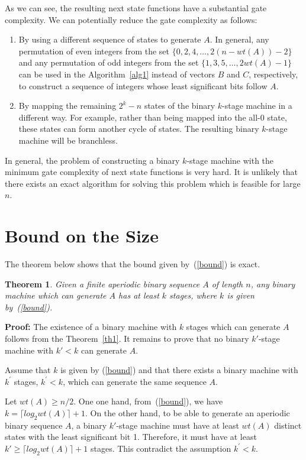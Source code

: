\documentclass[twocolumn]{IEEEtran} \usepackage{epsfig}
\newtheorem{theorem}{Theorem}
\begin{document}
As we can see, the resulting next state functions have a substantial gate complexity. We can potentially reduce the gate complexity as follows:
\begin{enumerate}
\item By using a different sequence of states to generate $A$. In general, any permutation of even integers from the set $\{0,2,4,\ldots,2(n-wt(A))-2\}$ and any permutation of odd integers from the set $\{1,3,5,\ldots,2wt(A)-1\}$ can be used in the Algorithm~\ref{alg1} instead of vectors $B$ and $C$, respectively, to construct a sequence of integers whose least significant bits follow $A$.
\item By mapping the remaining $2^k-n$ states of the binary $k$-stage machine in a different way.
For example, rather than being mapped into the all-0 state, these states can form another cycle of states.
The resulting binary $k$-stage machine will be branchless.
\end{enumerate}

In general, the problem of constructing a binary $k$-stage machine with the minimum gate complexity 
of next state functions is very hard. It is unlikely that there exists an exact algorithm for solving this problem 
which is feasible for large $n$.

\section{Bound on the Size}

The theorem below shows that the bound given by~(\ref{bound}) is exact.

\begin{theorem} \label{th2}
Given a finite aperiodic binary sequence $A$ of length $n$, any 
binary machine which can generate $A$  has at least $k$ stages, where
$k$ is given by~(\ref{bound}).
\end{theorem}
{\bf Proof:} 
The existence of a binary machine with $k$ stages which can generate $A$
follows from the Theorem~\ref{th1}.  
It remains to prove that no binary $k'$-stage machine with $k' < k$ can generate $A$.

Assume that $k$ is given by (\ref{bound}) and that there exists a binary machine with  
$k^{'}$ stages, $k^{'} < k$, which can generate the same sequence $A$. 

Let $wt(A) \geq n/2$. One one hand, from~(\ref{bound}), we have $k = \lceil log_2 wt(A) \rceil + 1$.
On the other hand, to be able to generate an aperiodic binary sequence $A$, a binary $k'$-stage machine 
must have at least $wt(A)$ distinct states with the least significant bit 1. Therefore, it must have at least 
$k' \geq \lceil log_2 wt(A) \rceil + 1$ stages. This contradict the assumption $k^{'} < k$.
\end{document}

